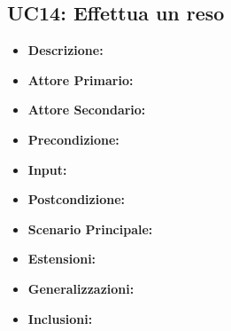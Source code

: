         \subsection{UC14: Effettua un reso}
        \begin{itemize}
            \item \textbf{Descrizione:}
            \item \textbf{Attore Primario:}
            \item \textbf{Attore Secondario:}
            \item \textbf{Precondizione:}
            \item \textbf{Input:}
            \item \textbf{Postcondizione:}
            \item \textbf{Scenario Principale:}
            \item \textbf{Estensioni:}
            \item \textbf{Generalizzazioni:}
            \item \textbf{Inclusioni:}
        \end{itemize}


